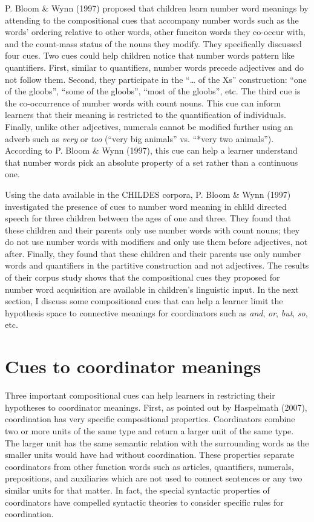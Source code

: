 \documentclass[oneside]{report}
\theoremstyle{definition}
\theoremstyle{definition}
\theoremstyle{definition}
\theoremstyle{remark}
\begin{document}
P. Bloom \& Wynn (1997) proposed that children learn number word
meanings by attending to the compositional cues that accompany number
words such as the words' ordering relative to other words, other
funciton words they co-occur with, and the count-mass status of the
nouns they modify. They specifically discussed four cues. Two cues could
help children notice that number words pattern like quantifiers. First,
similar to quantifiers, number words precede adjectives and do not
follow them. Second, they participate in the ``\ldots{} of the Xs''
construction: ``one of the gloobs'', ``some of the gloobs'', ``most of
the gloobs'', etc. The third cue is the co-occurrence of number words
with count nouns. This cue can inform learners that their meaning is
restricted to the quantification of individuals. Finally, unlike other
adjectives, numerals cannot be modified further using an adverb such as
\emph{very} or \emph{too} (``very big animals'' vs. ``*very two
animals''). According to P. Bloom \& Wynn (1997), this cue can help a
learner understand that number words pick an absolute property of a set
rather than a continuous one.

Using the data available in the CHILDES corpora, P. Bloom \& Wynn (1997)
investigated the presence of cues to number word meaning in chlild
directed speech for three children between the ages of one and three.
They found that these children and their parents only use number words
with count nouns; they do not use number words with modifiers and only
use them before adjectives, not after. Finally, they found that these
children and their parents use only number words and quantifiers in the
partitive construction and not adjectives. The results of their corpus
study shows that the compositional cues they proposed for number word
acquisition are available in children's linguistic input. In the next
section, I discuss some compositional cues that can help a learner limit
the hypothesis space to connective meanings for coordinators such as
\emph{and}, \emph{or}, \emph{but}, \emph{so}, etc.

\section{Cues to coordinator
meanings}\label{cues-to-coordinator-meanings}

Three important compositional cues can help learners in restricting
their hypotheses to coordinator meanings. First, as pointed out by
Haspelmath (2007), coordination has very specific compositional
properties. Coordinators combine two or more units of the same type and
return a larger unit of the same type. The larger unit has the same
semantic relation with the surrounding words as the smaller units would
have had without coordination. These properties separate coordinators
from other function words such as articles, quantifiers, numerals,
prepositions, and auxiliaries which are not used to connect sentences or
any two similar units for that matter. In fact, the special syntactic
properties of coordinators have compelled syntactic theories to consider
specific rules for coordination.
\end{document}
